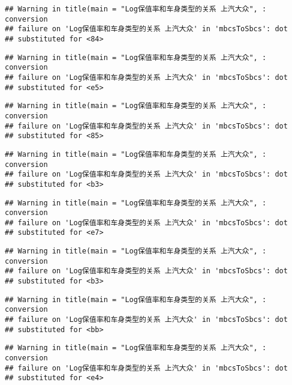 \documentclass[]{article}
\begin{document}
\begin{verbatim}
## Warning in title(main = "Log保值率和车身类型的关系 上汽大众", : conversion
## failure on 'Log保值率和车身类型的关系 上汽大众' in 'mbcsToSbcs': dot
## substituted for <84>
\end{verbatim}

\begin{verbatim}
## Warning in title(main = "Log保值率和车身类型的关系 上汽大众", : conversion
## failure on 'Log保值率和车身类型的关系 上汽大众' in 'mbcsToSbcs': dot
## substituted for <e5>
\end{verbatim}

\begin{verbatim}
## Warning in title(main = "Log保值率和车身类型的关系 上汽大众", : conversion
## failure on 'Log保值率和车身类型的关系 上汽大众' in 'mbcsToSbcs': dot
## substituted for <85>
\end{verbatim}

\begin{verbatim}
## Warning in title(main = "Log保值率和车身类型的关系 上汽大众", : conversion
## failure on 'Log保值率和车身类型的关系 上汽大众' in 'mbcsToSbcs': dot
## substituted for <b3>
\end{verbatim}

\begin{verbatim}
## Warning in title(main = "Log保值率和车身类型的关系 上汽大众", : conversion
## failure on 'Log保值率和车身类型的关系 上汽大众' in 'mbcsToSbcs': dot
## substituted for <e7>
\end{verbatim}

\begin{verbatim}
## Warning in title(main = "Log保值率和车身类型的关系 上汽大众", : conversion
## failure on 'Log保值率和车身类型的关系 上汽大众' in 'mbcsToSbcs': dot
## substituted for <b3>
\end{verbatim}

\begin{verbatim}
## Warning in title(main = "Log保值率和车身类型的关系 上汽大众", : conversion
## failure on 'Log保值率和车身类型的关系 上汽大众' in 'mbcsToSbcs': dot
## substituted for <bb>
\end{verbatim}

\begin{verbatim}
## Warning in title(main = "Log保值率和车身类型的关系 上汽大众", : conversion
## failure on 'Log保值率和车身类型的关系 上汽大众' in 'mbcsToSbcs': dot
## substituted for <e4>
\end{verbatim}
\end{document}
